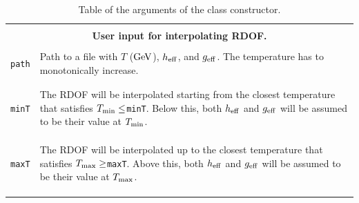 \documentclass[11pt,a4paper]{article}
\begin{document}
\begin{table}[p]
	\centering
	\begin{tabular}{l l}
		
		\hline\\[-0.4cm]
		\multicolumn{2}{c}{\bf User input for interpolating RDOF.}  \\
		\hline\\[-0.4cm]
		
		{\tt path} & \multirow{1}{12cm}{Path to a file with $T$ (${\rm GeV}$), $h_{\rm eff}{}$, and $g_{\rm eff}{}$. The temperature has to monotonically increase.}\\\\
		\hline\\[-0.4cm]
		
		{\tt minT} & \multirow{1}{12cm}{The RDOF will be interpolated starting from the closest temperature that satisfies $T_{\rm min}\leq${\tt minT}. Below this, both $h_{\rm eff}{}$ and $g_{\rm eff}{}$ will be assumed to be their value at $T_{\rm min}$.}\\\\\\
		\hline\\[-0.4cm]
		
		{\tt maxT} & \multirow{1}{12cm}{The RDOF will be interpolated up to the closest temperature that satisfies $T_{\rm max}\geq${\tt maxT}. Above this, both $h_{\rm eff}{}$ and $g_{\rm eff}{}$ will be assumed to be their value at $T_{\rm max}$.}\\\\\\
		\hline\\[-0.4cm]
	\end{tabular}
	\caption{Table of the arguments of the  class constructor.}
	\label{tab:Cosmo-input}
\end{table}
%
\end{document}
